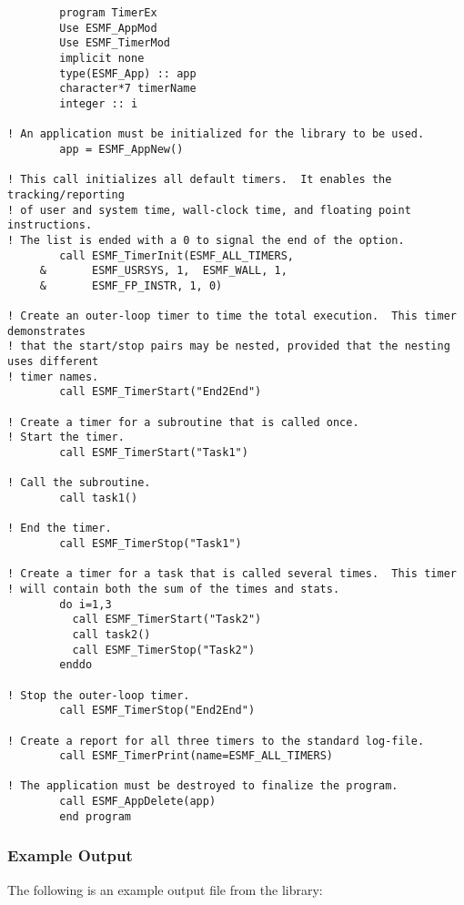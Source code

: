 \begin{verbatim}
        program TimerEx
        Use ESMF_AppMod
        Use ESMF_TimerMod
        implicit none
        type(ESMF_App) :: app
        character*7 timerName
        integer :: i

! An application must be initialized for the library to be used.
        app = ESMF_AppNew()

! This call initializes all default timers.  It enables the tracking/reporting
! of user and system time, wall-clock time, and floating point instructions.  
! The list is ended with a 0 to signal the end of the option.
        call ESMF_TimerInit(ESMF_ALL_TIMERS,
     &       ESMF_USRSYS, 1,  ESMF_WALL, 1,
     &       ESMF_FP_INSTR, 1, 0)

! Create an outer-loop timer to time the total execution.  This timer demonstrates
! that the start/stop pairs may be nested, provided that the nesting uses different
! timer names.
        call ESMF_TimerStart("End2End")

! Create a timer for a subroutine that is called once.
! Start the timer.
        call ESMF_TimerStart("Task1")

! Call the subroutine.
        call task1()

! End the timer.
        call ESMF_TimerStop("Task1")

! Create a timer for a task that is called several times.  This timer
! will contain both the sum of the times and stats.
        do i=1,3
          call ESMF_TimerStart("Task2")
          call task2()
          call ESMF_TimerStop("Task2")
        enddo

! Stop the outer-loop timer.
        call ESMF_TimerStop("End2End")

! Create a report for all three timers to the standard log-file.
        call ESMF_TimerPrint(name=ESMF_ALL_TIMERS)

! The application must be destroyed to finalize the program.
        call ESMF_AppDelete(app)
        end program

\end{verbatim}

\subsubsection{Example Output}

The following is an example output file from the library:

